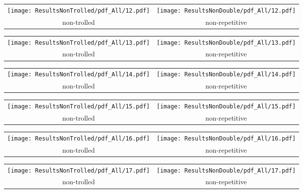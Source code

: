 \begin{tabular}{cc}
{  \texttt{[image: ResultsNonTrolled/pdf\_All/12.pdf]} } & 
{  \texttt{[image: ResultsNonDouble/pdf\_All/12.pdf]}} \\
 non-trolled & non-repetitive \\
\end{tabular}

\begin{tabular}{cc}
{  \texttt{[image: ResultsNonTrolled/pdf\_All/13.pdf]} } & 
{  \texttt{[image: ResultsNonDouble/pdf\_All/13.pdf]}} \\
 non-trolled & non-repetitive \\
\end{tabular}

\begin{tabular}{cc}
{  \texttt{[image: ResultsNonTrolled/pdf\_All/14.pdf]} } & 
{  \texttt{[image: ResultsNonDouble/pdf\_All/14.pdf]}} \\
 non-trolled & non-repetitive \\
\end{tabular}

\begin{tabular}{cc}
{  \texttt{[image: ResultsNonTrolled/pdf\_All/15.pdf]} } & 
{  \texttt{[image: ResultsNonDouble/pdf\_All/15.pdf]}} \\
 non-trolled & non-repetitive \\
\end{tabular}

\begin{tabular}{cc}
{  \texttt{[image: ResultsNonTrolled/pdf\_All/16.pdf]} } & 
{  \texttt{[image: ResultsNonDouble/pdf\_All/16.pdf]}} \\
 non-trolled & non-repetitive \\
\end{tabular}

\begin{tabular}{cc}
{  \texttt{[image: ResultsNonTrolled/pdf\_All/17.pdf]} } & 
{  \texttt{[image: ResultsNonDouble/pdf\_All/17.pdf]}} \\
 non-trolled & non-repetitive \\
\end{tabular}

